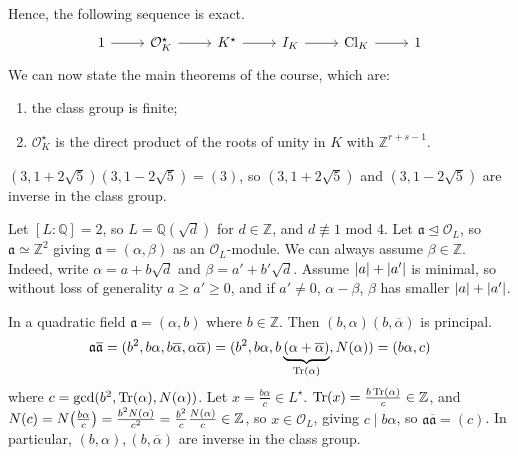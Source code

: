 Hence, the following sequence is exact.
\[\begin{tikzcd}
	1 & {\mathcal O_K^\star} & {K^\star} & {I_K} & {\mathrm{Cl}_K} & 1
	\arrow[from=1-1, to=1-2]
	\arrow[from=1-2, to=1-3]
	\arrow[from=1-3, to=1-4]
	\arrow[from=1-4, to=1-5]
	\arrow[from=1-5, to=1-6]
\end{tikzcd}\]
We can now state the main theorems of the course, which are:
\begin{enumerate}
    \item the class group is finite;
    \item \( \mathcal O_K^\star \) is the direct product of the roots of unity in \( K \) with \( \mathbb Z^{r+s-1} \).
\end{enumerate}
\begin{example}
    \( (3,1+2\sqrt{5})(3,1-2\sqrt{5}) = (3) \), so \( (3,1+2\sqrt{5}) \) and \( (3,1-2\sqrt{5}) \) are inverse in the class group.
\end{example}
\begin{example}
   Let  \( [L:\mathbb Q] = 2 \), so \( L = \mathbb Q(\sqrt{d}) \) for \( d \in \mathbb Z \), and \( d \not\equiv 1 \) mod 4.
   Let \( \mathfrak a \trianglelefteq \mathcal O_L \), so \( \mathfrak a \simeq \mathbb Z^2 \) giving \( \mathfrak a = (\alpha, \beta) \) as an \( \mathcal O_L \)-module.
   We can always assume \( \beta \in \mathbb Z \).
   Indeed, write \( \alpha = a + b \sqrt{d} \) and \( \beta = a' + b' \sqrt{d} \).
   Assume \( \abs{a} + \abs{a'} \) is minimal, so without loss of generality \( a \geq a' \geq 0 \), and if \( a' \neq 0 \), \( \alpha - \beta \), \( \beta \) has smaller \( \abs{a} + \abs{a'} \).
\end{example}
\begin{example}
    In a quadratic field \( \mathfrak a = (\alpha, b) \) where \( b \in \mathbb Z \).
    Then \( (b, \alpha) (b, \overline \alpha) \) is principal.
    \[ \mathfrak a \overline{\mathfrak a} = (b^2, b\alpha, b\overline \alpha, \alpha\overline\alpha) = (b^2, b\alpha, b\underbrace{(\alpha + \overline \alpha)}_{\Tr(\alpha)}, N(\alpha)) = (b\alpha, c) \]
    where \( c = \gcd(b^2, \Tr(\alpha), N(\alpha)) \).
    Let \( x = \frac{b\alpha}{c} \in L^\star \).
    \( \Tr(x) = \frac{b\Tr(\alpha)}{c} \in \mathbb Z \), and \( N(c) = N\qty(\frac{b\alpha}{c}) = \frac{b^2 N(\alpha)}{c^2} = \frac{b^2}{c} \frac{N(\alpha)}{c} \in \mathbb Z \), so \( x \in \mathcal O_L \), giving \( c \mid b\alpha \), so \( \mathfrak a \overline{\mathfrak a} = (c) \).
    In particular, \( (b, \alpha), (b, \overline \alpha) \) are inverse in the class group.
\end{example}

